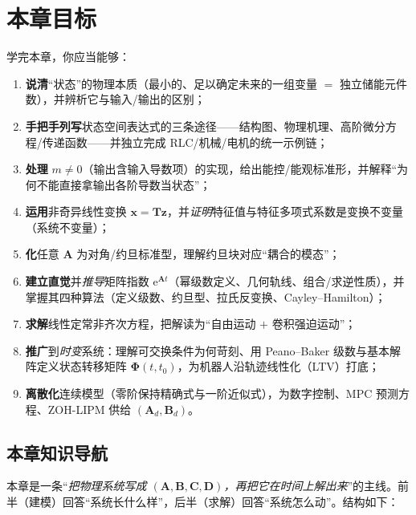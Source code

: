 \section*{本章目标}
学完本章，你应当能够：
\begin{enumerate}
  \item \textbf{说清}“状态”的物理本质（最小的、足以确定未来的一组变量 $=$ 独立储能元件数），并辨析它与输入/输出的区别；
  \item \textbf{手把手列写}状态空间表达式的三条途径——结构图、物理机理、高阶微分方程/传递函数——并独立完成 RLC/机械/电机的统一示例链；
  \item \textbf{处理} $m\neq0$（输出含输入导数项）的实现，给出能控/能观标准形，并解释“为何不能直接拿输出各阶导数当状态”；
  \item \textbf{运用}非奇异线性变换 $\mathbf{x}=\mathbf{T}\mathbf{z}$，并\emph{证明}特征值与特征多项式系数是变换不变量（系统不变量）；
  \item \textbf{化}任意 $\mathbf{A}$ 为对角/约旦标准型，理解约旦块对应“耦合的模态”；
  \item \textbf{建立直觉}并\emph{推导}矩阵指数 $\mathrm{e}^{\mathbf{A}t}$（幂级数定义、几何轨线、组合/求逆性质），并掌握其四种算法（定义级数、约旦型、拉氏反变换、Cayley--Hamilton）；
  \item \textbf{求解}线性定常非齐次方程，把解读为“自由运动 $+$ 卷积强迫运动”；
  \item \textbf{推广}到\emph{时变}系统：理解可交换条件为何苛刻、用 Peano--Baker 级数与基本解阵定义状态转移矩阵 $\boldsymbol{\Phi}(t,t_0)$，为机器人沿轨迹线性化（LTV）打底；
  \item \textbf{离散化}连续模型（零阶保持精确式与一阶近似式），为数字控制、MPC 预测方程、ZOH-LIPM 供给 $(\mathbf{A}_d,\mathbf{B}_d)$。
\end{enumerate}

\subsection*{本章知识导航}
本章是一条“\emph{把物理系统写成 $(\mathbf{A},\mathbf{B},\mathbf{C},\mathbf{D})$，再把它在时间上解出来}”的主线。前半（建模）回答“系统长什么样”，后半（求解）回答“系统怎么动”。结构如下：

